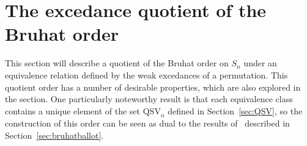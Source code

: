 \documentclass[12pt]{article}
\newtheorem{prop}[equation]{Proposition}
\theoremstyle{definition}
\theoremstyle{remark}
\numberwithin{equation}{section}
\renewcommand{\setminus}{-}
\newcommand{\QSV}{\mathrm{QSV}}
\newcommand{\NCP}{\mathrm{NCP}}
\begin{document}
%
%
%

\section{The excedance quotient of the Bruhat order}
\label{sec:excedance}

This section will describe a quotient of the Bruhat order on $S_{n}$ under an equivalence relation defined by the weak excedances of a permutation.  
This quotient order has a number of desirable properties, which are also explored in the section.  
One particularly noteworthy result is that each equivalence class contains a unique element of the set $\QSV_{n}$ defined in Section~\ref{sec:QSV}, so the construction of this order can be seen as dual to the results of~\cite{GobetWilliams} described in Section~\ref{sec:bruhatballot}.  
\end{document}
